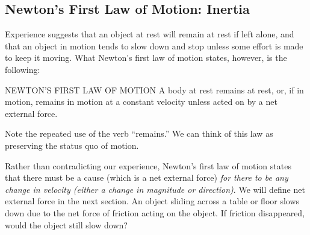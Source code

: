 \documentclass[../../main-ap-physics.tex]{subfiles}
\begin{document}
\vspace{1em}



\subsection{Newton's First Law of Motion: Inertia}

Experience suggests that an object at rest will remain at rest if left alone, and that an object in motion tends to slow down and stop unless some effort is made to keep it moving. What \gls{Newton's first law of motion} states, however, is the following:

\begin{gradient}{NEWTON'S FIRST LAW OF MOTION}
    A body at rest remains at rest, or, if in motion, remains in motion at a constant velocity unless acted on by a net external force.
\end{gradient}

Note the repeated use of the verb ``remains.'' We can think of this law as preserving the status quo of motion.

\vspace{1em}

Rather than contradicting our experience, Newton's first law of motion states that there must be a cause (which is a net external force) \textit{for there to be any change in velocity (either a change in magnitude or direction)}. We will define net external force in the next section. An object sliding across a table or floor slows down due to the net force of friction acting on the object. If friction disappeared, would the object still slow down?

\vspace{1em}
\end{document}
